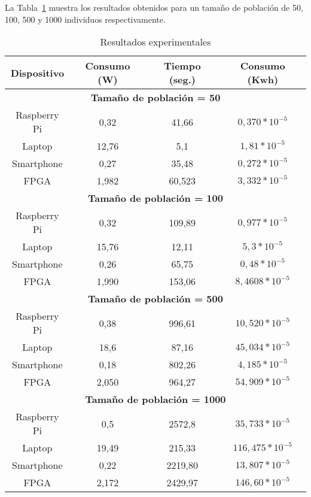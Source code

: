 La Tabla~\ref{Table:result_todos} muestra los resultados obtenidos para un tamaño de población de 50, 100, 500 y 1000 individuos respectivamente. 
\begin{small}
 
\begin{table}[!ht]
\renewcommand{\arraystretch}{1.3}
\centering
\caption{Resultados experimentales}
\label{Table:result_todos}
\begin{tabular}{cccc} \hline
Dispositivo & Consumo (W) & Tiempo (seg.) & Consumo (Kwh) \\ \hline
\multicolumn{4}{c}{\textbf{Tamaño de población = 50}}\\ %
 Raspberry Pi & 0,32 & 41,66 &  $0,370*10^{-5}$ \\
 Laptop & 12,76 & 5,1 & $1,81*10^{-5}$ \\
 Smartphone & 0,27 & 35,48 & $0,272*10^{-5}$ \\
 FPGA & 1,982 & 60,523 & $3,332*10^{-5}$\\  \hline
\multicolumn{4}{c}{\textbf{Tamaño de población = 100}}\\ %
 Raspberry Pi & 0,32 & 109,89 &  $0,977*10^{-5}$ \\
 Laptop & 15,76 & 12,11 & $5,3*10^{-5}$ \\
 Smartphone & 0,26 & 65,75 & $0,48*10^{-5}$ \\
 FPGA & 1,990 & 153,06 & $8,4608*10^{-5}$ \\ \hline
\multicolumn{4}{c}{\textbf{Tamaño de población = 500}}\\ %
 Raspberry Pi & 0,38 & 996,61 &  $10,520*10^{-5}$ \\
 Laptop & 18,6 & 87,16 & $45,034*10^{-5}$ \\
 Smartphone & 0,18 & 802,26 & $4,185*10^{-5}$ \\
 FPGA & 2,050 & 964,27& $54,909*10^{-5}$\\ \hline
\multicolumn{4}{c}{\textbf{Tamaño de población = 1000}}\\ %
 Raspberry Pi & 0,5 & 2572,8 &  $35,733*10^{-5}$ \\
 Laptop & 19,49 & 215,33 & $116,475*10^{-5}$ \\
 Smartphone & 0,22 & 2219,80 & $13,807*10^{-5}$ \\
 FPGA & 2,172 &2429,97 & $146,60*10^{-5}$\\ \hline
\end{tabular}
\end{table} 
\end{small}

